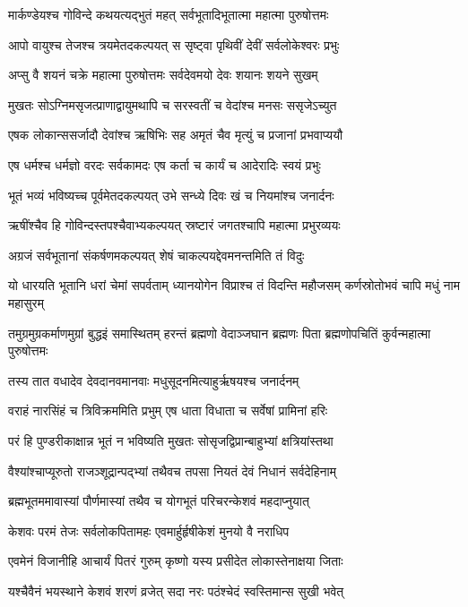 \twolineshloka
{मार्कण्डेयश्च गोविन्दे कथयत्यद्भुतं महत्}
{सर्वभूतादिभूतात्मा महात्मा पुरुषोत्तमः}


\twolineshloka
{आपो वायुश्च तेजश्च त्रयमेतदकल्पयत्}
{स सृष्ट्वा पृथिवीं देवीं सर्वलोकेश्वरः प्रभुः}


\twolineshloka
{अप्सु वै शयनं चक्रे महात्मा पुरुषोत्तमः}
{सर्वदेवमयो देवः शयानः शयने सुखम्}


\twolineshloka
{मुखतः सोऽग्निमसृजत्प्राणाद्वायुमथापि च}
{सरस्वतीं च वेदांश्च मनसः ससृजेऽच्युत}


\twolineshloka
{एषक लोकान्ससर्जादौ देवांश्च ऋषिभिः सह}
{अमृतं चैव मृत्युं च प्रजानां प्रभवाप्ययौ}


\twolineshloka
{एष धर्मश्च धर्मज्ञो वरदः सर्वकामदः}
{एष कर्ता च कार्यं च आदेरादिः स्वयं प्रभुः}


\twolineshloka
{भूतं भव्यं भविष्यच्च पूर्वमेतदकल्पयत्}
{उभे सन्ध्ये दिवः खं च नियमांश्च जनार्दनः}


\twolineshloka
{ऋषींश्चैव हि गोविन्दस्तपश्चैवाभ्यकल्पयत्}
{स्रष्टारं जगतश्चापि महात्मा प्रभुरव्ययः}


\twolineshloka
{अग्रजं सर्वभूतानां संकर्षणमकल्पयत्}
{शेषं चाकल्पयद्देवमनन्तमिति तं विदुः}


\threelineshloka
{यो धारयति भूतानि धरां चेमां सपर्वताम्}
{ध्यानयोगेन विप्राश्च तं विदन्ति महौजसम्}
{कर्णस्रोतोभवं चापि मधुं नाम महासुरम्}


\threelineshloka
{तमुग्रमुग्रकर्माणमुग्रां बुद्धइं समास्थितम्}
{हरन्तं ब्रह्मणो वेदाञ्जघान ब्रह्मणः पिता}
{ब्रह्मणोपचितिं कुर्वन्महात्मा पुरुषोत्तमः}


\twolineshloka
{तस्य तात वधादेव देवदानवमानवाः}
{मधुसूदनमित्याहुर्ऋषयश्च जनार्दनम्}


\twolineshloka
{वराहं नारसिंहं च त्रिविक्रममिति प्रभुम्}
{एष धाता विधाता च सर्वेषां प्रामिनां हरिः}


\twolineshloka
{परं हि पुण्डरीकाक्षान्न भूतं न भविष्यति}
{मुखतः सोसृजद्विप्रान्बाहुभ्यां क्षत्रियांस्तथा}


\twolineshloka
{वैश्यांश्चाप्यूरुतो राजञ्शूद्रान्पद्भ्यां तथैवच}
{तपसा नियतं देवं निधानं सर्वदेहिनाम्}


\twolineshloka
{ब्रह्मभूतममावास्यां पौर्णमास्यां तथैव च}
{योगभूतं परिचरन्केशवं महदाप्नुयात्}


\twolineshloka
{केशवः परमं तेजः सर्वलोकपितामहः}
{एवमार्हुर्हृषीकेशं मुनयो वै नराधिप}


\twolineshloka
{एवमेनं विजानीहि आचार्यं पितरं गुरुम्}
{कृष्णो यस्य प्रसीदेत लोकास्तेनाक्षया जिताः}


\twolineshloka
{यश्चैवैनं भयस्थाने केशवं शरणं व्रजेत्}
{सदा नरः पठंश्चेदं स्वस्तिमान्स सुखी भवेत्}


